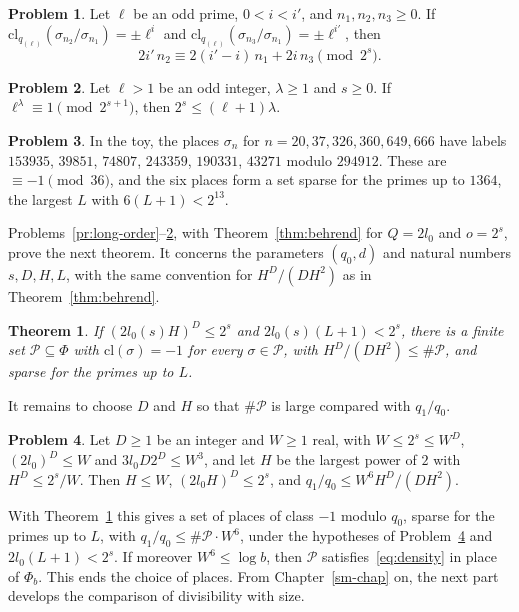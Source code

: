 \documentclass[reqno]{amsart}
\newcounter{chap}
\theoremstyle{definition}
\newtheorem{problem}{Problem}[section]
\theoremstyle{plain}
\newtheorem{theorem}{Theorem}[section]
\newcommand{\Pc}{\mathcal{P}}
\begin{document}
\begin{problem}\label{pr:frob-thick}
Let \(\ell\) be an odd prime, \(0 < i < i'\), and \(n_1, n_2, n_3 \ge 0\).  If \(\mathrm{cl}_{q_{(\ell)}}(\sigma_{n_2}/\sigma_{n_1}) = \pm\ell^i\) and \(\mathrm{cl}_{q_{(\ell)}}(\sigma_{n_3}/\sigma_{n_1}) = \pm\ell^{i'}\), then
\[
  2i'\,n_2 \equiv 2(i' - i)\,n_1 + 2i\,n_3 \pmod{2^s}.
\]
\end{problem}

\begin{problem}\label{pr:two-power}
Let \(\ell > 1\) be an odd integer, \(\lambda \ge 1\) and \(s \ge 0\).  If \(\ell^\lambda \equiv 1 \pmod{2^{s+1}}\), then \(2^s \le (\ell + 1)\lambda\).
\end{problem}

\begin{problem}\label{pr:toy}
In the toy, the places \(\sigma_n\) for \(n = 20, 37, 326, 360, 649, 666\) have labels \(153935\), \(39851\), \(74807\), \(243359\), \(190331\), \(43271\) modulo \(294912\).  These are \(\equiv -1 \pmod{36}\), and the six places form a set sparse for the primes up to \(1364\), the largest \(L\) with \(6(L+1) < 2^{13}\).
\end{problem}

Problems~\ref{pr:long-order}--\ref{pr:two-power}, with Theorem~\ref{thm:behrend} for \(Q = 2l_0\) and \(o = 2^s\), prove the next theorem.  It concerns the parameters \((q_0, d)\) and natural numbers \(s, D, H, L\), with the same convention for \(H^D/(DH^2)\) as in Theorem~\ref{thm:behrend}.

\begin{theorem}\label{thm:progressions}
If \((2l_0(s)H)^D \le 2^s\) and \(2l_0(s)(L+1) < 2^s\), there is a finite set \(\Pc \subseteq \Phi\) with \(\mathrm{cl}(\sigma) = -1\) for every \(\sigma \in \Pc\), with \(H^D/(DH^2) \le \#\Pc\), and sparse for the primes up to \(L\).
\end{theorem}

It remains to choose \(D\) and \(H\) so that \(\#\Pc\) is large compared with \(q_1/q_0\).

\begin{problem}\label{pr:count}
Let \(D \ge 1\) be an integer and \(W \ge 1\) real, with \(W \le 2^s \le W^D\), \((2l_0)^D \le W\) and \(3l_0 D 2^D \le W^3\), and let \(H\) be the largest power of \(2\) with \(H^D \le 2^s/W\).  Then \(H \le W\), \((2l_0 H)^D \le 2^s\), and \(q_1/q_0 \le W^6 H^D/(DH^2)\).
\end{problem}

With Theorem~\ref{thm:progressions} this gives a set of places of class \(-1\) modulo \(q_0\), sparse for the primes up to \(L\), with \(q_1/q_0 \le \#\Pc\cdot W^6\), under the hypotheses of Problem~\ref{pr:count} and \(2l_0(L+1) < 2^s\).  If moreover \(W^6 \le \log b\), then \(\Pc\) satisfies~\eqref{eq:density} in place of \(\Phi_b\).  This ends the choice of places.  From Chapter~\ref{sm-chap} on, the next part develops the comparison of divisibility with size.
\end{document}

